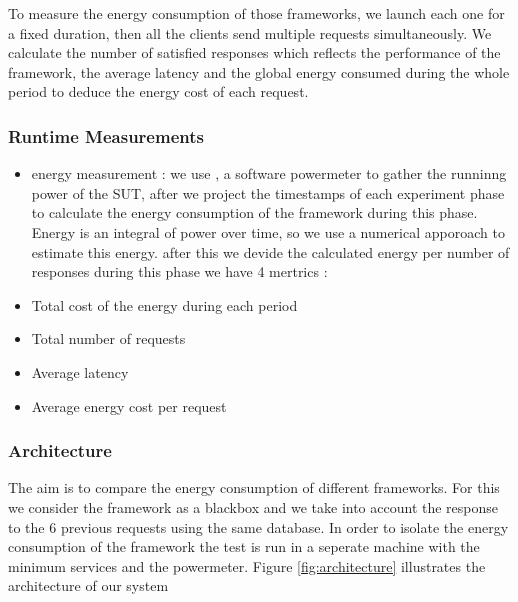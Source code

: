 To measure the energy consumption of those frameworks, we launch each one for a fixed duration, then all the clients send multiple requests simultaneously.
We calculate %
the number of satisfied responses which reflects the performance of the framework, the average latency and the global energy consumed during the whole period to deduce the energy cost of each request.


\subsubsection{Runtime Measurements}
\begin{itemize}
    \item energy measurement :
          we use , a software powermeter  to gather the runninng power of the SUT, after we project the timestamps of each experiment phase to calculate the energy consumption of the framework during this phase.
          Energy is an integral of power over time, so we use a numerical apporoach to estimate this energy. 
          after this we devide the calculated energy per number of responses
          during this phase
          we have 4 mertrics :

    \item Total cost of the energy during each period
    \item Total number of requests
    \item Average latency
    \item Average energy cost per request
\end{itemize}

\subsubsection{Architecture}
The aim is to compare the energy consumption of different frameworks. For this we consider the framework as a blackbox and we take into account the response to the 6 previous requests using the same database.
In order to isolate the energy consumption of the framework the test is run in a seperate machine with the minimum services and the powermeter.
Figure \ref{fig:architecture} illustrates the architecture of our system


